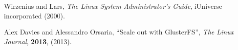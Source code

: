 \documentclass[twoside,a4paper,12pt,english]{inac17}
\begin{document}

\begin{thebibliography}{99} %

 Wirzenius and Lars, \textit{The  Linux System Administrator's Guide}, iUniverse incorporated (2000).


 Alex Davies and Alessandro Orsaria, ``Scale out with GlusterFS'', \textit{The Linux Journal}, \textbf{2013}, (2013).






\end{thebibliography}


%
%
\end{document}

